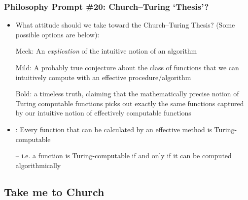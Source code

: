 \begin{frame}
\frametitle{Philosophy Prompt \#20: Church--Turing `Thesis'?}

\begin{itemize}%

\item What attitude should we take toward the Church--Turing Thesis? (Some possible options are below):

\bi
\item[Meek:] An \textit{explication} of the intuitive notion of an algorithm 

\item[Mild:] A probably true conjecture about the class of functions that we can intuitively compute with an effective procedure/algorithm %

\item[Bold:] a timeless truth, claiming that the mathematically precise notion of Turing computable functions picks out exactly the same functions captured by our intuitive notion of effectively computable functions
\ei

\item {}: Every function that can be calculated by an effective method is Turing-computable

\item[]  -- i.e. a function is Turing-computable if and only if it can be computed algorithmically


\end{itemize}
\end{frame}


\subsection{Take me to Church}

